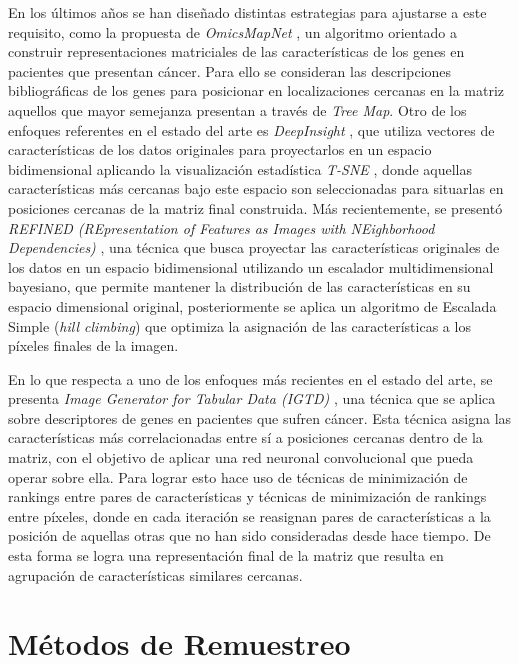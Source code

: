 En los últimos años se han diseñado distintas estrategias para ajustarse a este requisito, como la propuesta de \textit{OmicsMapNet} \cite{ma2019omicsmapnet}, un algoritmo orientado a construir representaciones matriciales de las características de los genes en pacientes que presentan cáncer. Para ello se consideran las descripciones bibliográficas de los genes para posicionar en localizaciones cercanas en la matriz aquellos que mayor semejanza presentan a través de \textit{Tree Map}. Otro de los enfoques referentes en el estado del arte es \textit{DeepInsight} \cite{Sharma2019}, que utiliza vectores de características de los datos originales para proyectarlos en un espacio bidimensional aplicando la visualización estadística \textit{T-SNE} \cite{van2008visualizing}, donde aquellas características más cercanas bajo este espacio son seleccionadas para situarlas en posiciones cercanas de la matriz final construida. Más recientemente, se presentó \textit{REFINED (REpresentation of Features as Images with NEighborhood Dependencies)} \cite{Bazgir2020}, una técnica que busca proyectar las características originales de los datos en un espacio bidimensional utilizando un escalador multidimensional bayesiano, que permite mantener la distribución de las características en su espacio dimensional original, posteriormente se aplica un algoritmo de Escalada Simple (\textit{hill climbing}) que optimiza la asignación de las características a los píxeles finales de la imagen.

En lo que respecta a uno de los enfoques más recientes en el estado del arte, se presenta \textit{Image Generator for Tabular Data (IGTD)} \cite{Zhu2021}, una técnica que se aplica sobre descriptores de genes en pacientes que sufren cáncer. Esta técnica asigna las características más correlacionadas entre sí a posiciones cercanas dentro de la matriz, con el objetivo de aplicar una red neuronal convolucional que pueda operar sobre ella. Para lograr esto hace uso de técnicas de minimización de rankings entre pares de características y técnicas de minimización de rankings entre píxeles, donde en cada iteración se reasignan pares de características a la posición de aquellas otras que no han sido consideradas desde hace tiempo. De esta forma se logra una representación final de la matriz que resulta en agrupación de características similares cercanas.

\section{Métodos de Remuestreo}
\label{SOAT_RESAMPLING}

